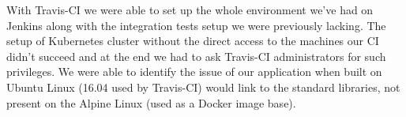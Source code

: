 With Travis-CI we were able to set up the whole environment we’ve had on Jenkins along with the
integration tests setup we were previously lacking. The setup of Kubernetes cluster without the direct
access to the machines our CI didn’t succeed and at the end we had to ask Travis-CI administrators
for such privileges. We were able to identify the issue of our application when built on Ubuntu Linux
(16.04 used by Travis-CI) would link to the standard libraries, not present on the Alpine Linux
(used as a Docker image base). 

